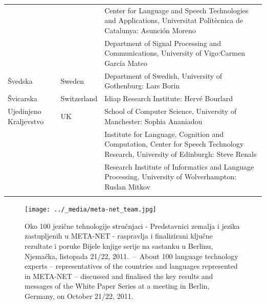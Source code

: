 \begin{longtable}{llp{115mm}}
  & & Center for Language and Speech Technologies and Applications, Universitat Politècnica de Catalunya:  Asunción Moreno \\ \addlinespace 
  & & Department of Signal Processing and Communications, University of Vigo:\newline Carmen García Mateo \\ \addlinespace 
  Švedska & \textcolor{grey1}{Sweden} & Department of Swedish, University of Gothenburg: Lars Borin \\ \addlinespace 
  Švicarska & \textcolor{grey1}{Switzerland} & Idiap Research Institute: Hervé Bourlard \\ \addlinespace 
  Ujedinjeno Kraljevstvo & \textcolor{grey1}{UK} & 
  School of Computer Science, University of Manchester: Sophia Ananiadou \\ \addlinespace 
  & & Institute for Language, Cognition and Computation, Center for Speech Technology Research, University of Edinburgh: Steve Renals \\ \addlinespace 
  & & Research Institute of Informatics and Language Processing, University of Wolverhampton: Ruslan Mitkov \\ \addlinespace 
\end{longtable}
\normalsize

\renewcommand*{\figureformat}{} 
\renewcommand*{\captionformat}{} 

\begin{figure}[htbp] 
  \center
    \texttt{[image: ../\_media/meta-net\_team.jpg]}
    \caption{Oko 100 jezične tehnologije stručnjaci - Predstavnici zemalja i
      jezika zastupljenih u META-NET - raspravlja i finalizirani ključne
      rezultate i poruke Bijele knjige serije na sastanku u Berlinu, Njemačka,
      listopada 21/22, 2011.~--~\textcolor{grey1}{About 100 language technology
      experts -- representatives of the countries and languages represented in
      META-NET -- discussed and finalised the key results and messages of the
      White Paper Series at a meeting in Berlin, Germany, on October 21/22,
      2011.}}
    \medskip {}
\end{figure} 

\cleardoublepage

\label{whitepaperseries}

